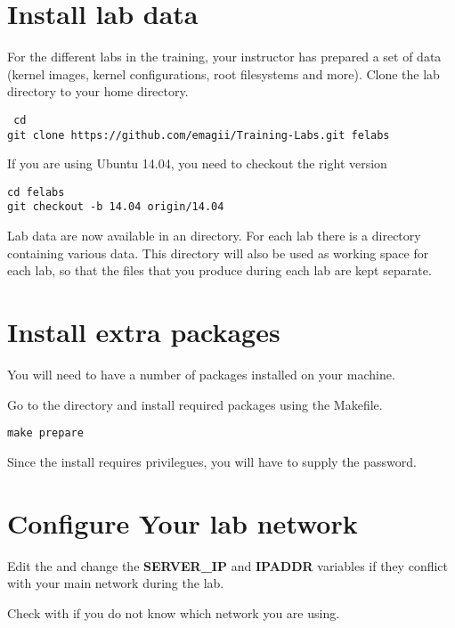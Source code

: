 
\section{Install lab data}

For the different labs in the training, your instructor has prepared a
set of data (kernel images, kernel configurations, root filesystems
and more). Clone the lab directory to your home directory.

{\small
{\tt
cd \\
git clone https://github.com/emagii/Training-Labs.git felabs
}
}

If you are using Ubuntu 14.04, you need to checkout the right version

\begin{verbatim}
cd felabs
git checkout -b 14.04 origin/14.04
\end{verbatim}

Lab data are now available in an \labdir directory. 
For each lab there is a directory containing various
data. This directory will also be used as working space for each lab,
so that the files that you produce during each lab are kept separate.

\section{Install extra packages}

You will need to have a number of packages installed on your machine.

Go to the \labdir directory and install required packages using the Makefile.

\begin{verbatim}
make prepare
\end{verbatim}

Since the install requires  privilegues, you will have to
supply the  password.

\section{Configure Your lab network}

Edit the  and change the {\bf SERVER\_IP} and {\bf IPADDR} variables if
they conflict with your main network during the lab.

Check with  if you do not know which network you are using.

